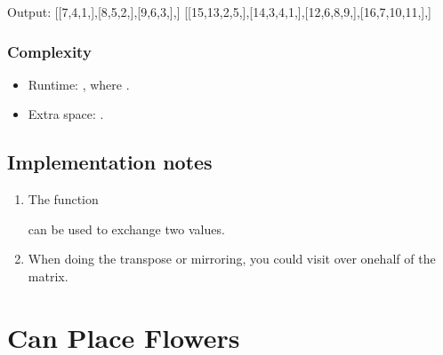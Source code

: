 \documentclass[letterpaper,12pt,english]{book}
\begin{document}
\begin{sphinxVerbatim}[commandchars=\\\{\}]
Output:
[[7,4,1,],[8,5,2,],[9,6,3,],]
[[15,13,2,5,],[14,3,4,1,],[12,6,8,9,],[16,7,10,11,],]
\end{sphinxVerbatim}


\subsubsection{Complexity}
\label{\detokenize{Array/01_ARR_48_Rotate_Image:complexity}}\begin{itemize}
\item {} 
\sphinxAtStartPar
Runtime: , where .

\item {} 
\sphinxAtStartPar
Extra space: .

\end{itemize}


\subsection{Implementation notes}
\label{\detokenize{Array/01_ARR_48_Rotate_Image:implementation-notes}}\begin{enumerate}
%
\item {} 
\sphinxAtStartPar
The function %
\begin{footnote}[9]\sphinxAtStartFootnote
{}
%
\end{footnote} can be used to exchange two values.

\item {} 
\sphinxAtStartPar
When doing the transpose or mirroring, you could visit over one\sphinxhyphen{}half of the matrix.

\end{enumerate}

\sphinxstepscope


\section{Can Place Flowers}
\label{\detokenize{Array/01_ARR_605_Can_Place_Flowers:can-place-flowers}}\label{\detokenize{Array/01_ARR_605_Can_Place_Flowers::doc}}
\end{document}
